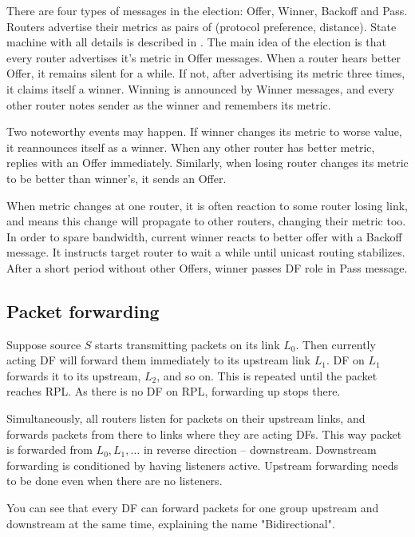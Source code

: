 There are four types of messages in the election: Offer, Winner, Backoff and
Pass. Routers advertise their metrics as pairs of (protocol preference, distance).
State machine with all details is described in . The main idea of the
election is that every router advertises it's metric in Offer messages. When
a router hears better Offer, it remains silent for a while. If not, after
advertising its metric three times, it claims itself a winner. Winning is
announced by Winner messages, and every other router notes sender as the
winner and remembers its metric.

Two noteworthy events may happen. If winner changes its metric to worse value,
it reannounces itself as a winner. When any other router has better metric,
replies with an Offer immediately. Similarly, when losing router changes its
metric to be better than winner's, it sends an Offer.

When metric changes at one router, it is often reaction to some router losing
link, and means this change will propagate to other routers, changing their
metric too. In order to spare bandwidth, current winner reacts to better offer
with a Backoff message. It instructs target router to wait a while until
unicast routing stabilizes. After a short period without other Offers, winner
passes DF role in Pass message.

\subsection{Packet forwarding}

Suppose source $S$ starts transmitting packets on its link $L_0$. Then
currently acting DF will forward them immediately to its upstream link $L_1$.
DF on $L_1$ forwards it to its upstream, $L_2$, and so on. This is repeated
until the packet reaches RPL. As there is no DF on RPL, forwarding up stops
there.

Simultaneously, all routers listen for packets on their upstream links, and
forwards packets from there to links where they are acting DFs. This way packet
is forwarded from $L_0, L_1, \dots$ in reverse direction -- downstream.
Downstream forwarding is conditioned by having listeners active. Upstream
forwarding needs to be done even when there are no listeners.

You can see that every DF can forward packets for one group upstream and
downstream at the same time, explaining the name "Bidirectional".
